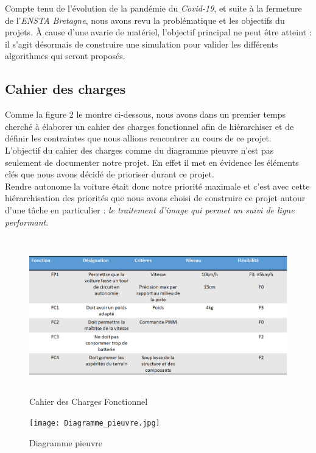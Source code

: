 \documentclass[12pt, openany]{report}
\begin{document}
Compte tenu de l'évolution de la pandémie du \textit{Covid-19}, et suite à la fermeture de l'\textit{ENSTA Bretagne}, nous avons revu la problématique et les objectifs du projets. À cause d'une avarie de matériel, l'objectif principal ne peut être atteint : il s'agit désormais de construire une simulation pour valider les différents algorithmes qui seront proposés.

\subsection{Cahier des charges}
Comme la figure 2 le montre ci-dessous, nous avons dans un premier temps cherché à élaborer un cahier des charges fonctionnel afin de hiérarchiser et de définir les contraintes que nous allions rencontrer au cours de ce projet.\\

L'objectif du cahier des charges comme du diagramme pieuvre n'est pas seulement de documenter notre projet. En effet il met en évidence les éléments clés que nous avons décidé de prioriser durant ce projet.\\

Rendre autonome la voiture était donc notre priorité maximale et c'est avec cette hiérarchisation des priorités que nous avons choisi de construire ce projet autour d'une tâche en particulier : \textit{le traitement d'image qui permet un suivi de ligne performant}. \\
\begin{figure}[H]
     \centering
     \includegraphics[width=\textwidth, height = 6.79cm]{Cahier des Charges.png}
     \caption{Cahier des Charges Fonctionnel}
     \label{fig:prob}
\end{figure}

\begin{figure}[H]
     \centering
     \texttt{[image: Diagramme\_pieuvre.jpg]}
     \caption{Diagramme pieuvre}
     \label{fig:prob}
\end{figure}
\end{document}
